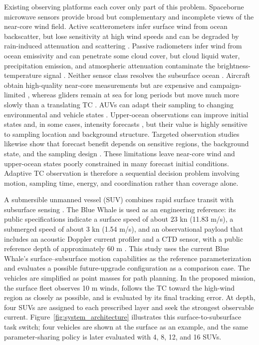 \documentclass[a4paper,fleqn]{cas-dc}
\begin{document}
Existing observing platforms each cover only part of this problem. Spaceborne
microwave sensors provide broad but complementary and incomplete views of the
near-core wind field. Active scatterometers infer surface wind from ocean
backscatter, but lose sensitivity at high wind speeds and can be degraded by
rain-induced attenuation and scattering \citep{r58}. Passive radiometers infer
wind from ocean emissivity and can penetrate some cloud cover, but cloud
liquid water, precipitation emission, and atmospheric attenuation contaminate
the brightness-temperature signal \citep{r58,r59}. Neither sensor class resolves
the subsurface ocean \citep{r13}. Aircraft obtain high-quality near-core
measurements but are expensive and campaign-limited \citep{r14,r15}, whereas
gliders remain at sea for long periods but move much more slowly than a
translating TC \citep{r16}. AUVs can adapt their sampling to changing
environmental and vehicle states \citep{r17}. Upper-ocean observations can
improve initial states and, in some cases, intensity forecasts
\citep{r18,r19,r20,r21,r22}, but their value is highly sensitive to sampling
location and background structure. Targeted observation studies likewise show
that forecast benefit depends on sensitive regions, the background state, and
the sampling design \citep{r23,r24,r25}. These limitations leave near-core wind
and upper-ocean states poorly constrained in many forecast initial conditions.
Adaptive TC observation is therefore a sequential decision problem involving
motion, sampling time, energy, and coordination rather than coverage alone.

A submersible unmanned vessel (SUV) combines rapid surface transit with
subsurface sensing \citep{r28,r29,r30,r31}. The Blue Whale is used as an
engineering reference: its public specifications indicate a surface speed of
about 23 kn (11.83 m/s), a submerged speed of about 3 kn (1.54 m/s), and an
observational payload that includes an acoustic Doppler current profiler and a
CTD sensor, with a public reference depth of approximately 60 m \citep{r28}.
This study uses the current Blue Whale's surface--subsurface motion capabilities
as the reference parameterization and evaluates a possible future-upgrade
configuration as a comparison case. The vehicles are simplified as point
masses for path planning. In the proposed mission, the surface fleet observes
10 m winds, follows the TC toward the high-wind region as closely as possible,
and is evaluated by its final tracking error. At depth, four SUVs are assigned
to each prescribed layer and seek the strongest observable current.
Figure~\ref{fig:system_architecture} illustrates this surface-to-subsurface task
switch; four vehicles are shown at the surface as an example, and the same
parameter-sharing policy is later evaluated with 4, 8, 12, and 16 SUVs.
\end{document}
